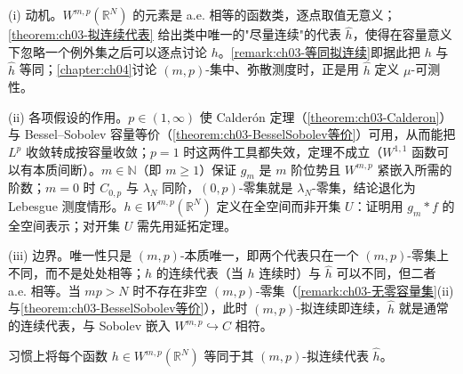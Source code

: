 \documentclass[../../main.tex]{subfiles}%
\begin{document}
\begin{remark}\label{remark:ch03-拟连续代表动机}
(i) 动机。$W^{m,p}(\mathbb{R}^N)$ 的元素是 a.e. 相等的函数类，逐点取值无意义；\cref{theorem:ch03-拟连续代表} 给出类中唯一的"尽量连续"的代表 $\widehat h$，使得在容量意义下忽略一个例外集之后可以逐点讨论 $h$。\cref{remark:ch03-等同拟连续}即据此把 $h$ 与 $\widehat h$ 等同；\cref{chapter:ch04}讨论 $(m,p)$-集中、弥散测度时，正是用 $\widehat h$ 定义 $\mu$-可测性。

(ii) 各项假设的作用。$p\in(1,\infty)$ 使 Calderón 定理（\cref{theorem:ch03-Calderon}）与 Bessel--Sobolev 容量等价（\cref{theorem:ch03-BesselSobolev等价}）可用，从而能把 $L^p$ 收敛转成按容量收敛；$p=1$ 时这两件工具都失效，定理不成立（$W^{1,1}$ 函数可以有本质间断）。$m\in\mathbb{N}$（即 $m\geqslant1$）保证 $g_m$ 是 $m$ 阶位势且 $W^{m,p}$ 紧嵌入所需的阶数；$m=0$ 时 $C_{0,p}$ 与 $\lambda_N$ 同阶，$(0,p)$-零集就是 $\lambda_N$-零集，结论退化为 Lebesgue 测度情形。$h\in W^{m,p}(\mathbb{R}^N)$ 定义在全空间而非开集 $U$：证明用 $g_m*f$ 的全空间表示；对开集 $U$ 需先用延拓定理。

(iii) 边界。唯一性只是 $(m,p)$-本质唯一，即两个代表只在一个 $(m,p)$-零集上不同，而不是处处相等；$h$ 的连续代表（当 $h$ 连续时）与 $\widehat h$ 可以不同，但二者 a.e. 相等。当 $mp>N$ 时不存在非空 $(m,p)$-零集（\cref{remark:ch03-无零容量集}(ii) 与\cref{theorem:ch03-BesselSobolev等价}），此时 $(m,p)$-拟连续即连续，$\widehat h$ 就是通常的连续代表，与 Sobolev 嵌入 $W^{m,p}\hookrightarrow C$ 相符。
\end{remark}

\begin{remark}\label{remark:ch03-等同拟连续}
习惯上将每个函数 $h\in W^{m,p}(\mathbb{R}^N)$ 等同于其 $(m,p)$-拟连续代表 $\widehat h$。
\end{remark}
\end{document}
